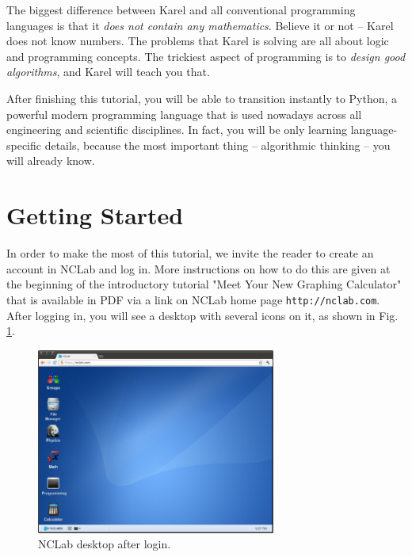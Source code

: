 \documentclass[article,A4,12pt]{llncs}
\begin{document}
The biggest difference between Karel and all conventional 
programming languages is that it {\em does not contain any mathematics}.
Believe it or not -- Karel does not know numbers. The problems that Karel
is solving are all about logic and programming concepts. The trickiest aspect
of programming is to {\em design good algorithms}, and Karel will teach you that.
 
After finishing this tutorial, you will be able to transition instantly to
Python, a powerful modern programming language that is used nowadays across
all engineering and scientific disciplines. In fact, you will be only learning 
language-specific details, because the most important thing -- algorithmic 
thinking -- you will already know.
 
\section{Getting Started}

In order to make the most of this tutorial, we invite the 
reader to create an account in NCLab and log in. More instructions 
on how to do this are given at the beginning of the introductory 
tutorial "Meet Your New Graphing Calculator" that is available in 
PDF via a link on NCLab home page {\tt http://nclab.com}.\\

\noindent
After logging in, you will see a desktop with several icons on it,
as shown in Fig. \ref{fig:desktop}. 


\begin{figure}[!ht]
\begin{center}
\includegraphics[width=0.7\textwidth]{img/desktop.png}
\end{center}
\caption{NCLab desktop after login.}
\vspace{-1cm}
\label{fig:desktop}
\end{figure}
\newpage
\end{document}
